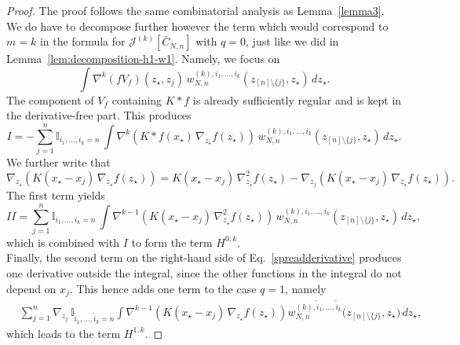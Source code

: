 \documentclass[pdflatex,sn-mathphys-num]{sn-jnl}
\theoremstyle{thmstyleone}%
\theoremstyle{thmstyletwo}%
\theoremstyle{thmstylethree}%
\begin{document}
\begin{proof} The proof follows the same combinatorial analysis as Lemma~\ref{lemma3}. We do have to decompose further however the term which would correspond to $m=k$ in the formula for $\mathcal{J}^{(k)}[\bar{C}_{N,n}]$ with $q=0$, just like we did in Lemma~\ref{lem:decomposition-h1-w1}. Namely, we focus on 
\[
\int \nabla^{k}(fV_f )(z_\star,z_j)\,
w^{(k),i_1,...,i_k}_{N,n}(z_{[n]\setminus\{j\}}, z_\star)\,dz_\star.
\]
The component of \(V_f\) containing \(K * f\) is already sufficiently regular and is kept in the derivative-free part. This produces
\[
I=-\sum_{j=1}^n \mathbb{I}_{i_1,\ldots,i_k=n}\,\int \nabla^k(K * f(x_\star)\,\nabla_{z_\star} f(z_\star))\,w^{(k),i_1,...,i_k}_{N,n}(z_{[n]\setminus\{j\}}, z_\star)\,dz_\star.
\]
We further write that
\begin{equation}
\nabla_{z_\star} (K(x_\star-x_j)\,\nabla_{z_\star} f(z_\star))=K(x_\star-x_j)\,\nabla_{z_\star}^2 f(z_\star)-\nabla_{z_j}(K(x_\star-x_j)\,\nabla_{z_\star} f(z_\star)).\label{spreadderivative}
\end{equation}
The first term yields
\[
II=\sum_{j=1}^n \mathbb{I}_{i_1,\ldots,i_k=n}\,\int \nabla^{k-1}(K(x_\star-x_j)\,\nabla_{z_\star}^2 f(z_\star))\,w^{(k),i_1,...,i_k}_{N,n}(z_{[n]\setminus\{j\}}, z_\star)\,dz_\star,
\]
which is combined with $I$ to form the term $H^{0,k}$.\\

\noindent
Finally, the second term on the right-hand side of Eq.~\eqref{spreadderivative} produces one derivative outside the integral, since the other functions in the integral do not depend on $x_j$. This hence adds one term to the case $q=1$, namely 
\[
\begin{aligned}
&
\sum_{j=1}^n
\nabla_{z_j}\,
\mathbb{I}_{\tilde i_1,\ldots,\tilde i_k=n}
\int
\nabla^{k-1}\!\left(
K(x_\star-x_j)\,
\nabla_{z_\star} f(z_\star)
\right)
w^{(k),\tilde i_1,\ldots,\tilde i_k}_{N,n}
\big(z_{[n]\setminus\{j\}},z_\star\big)\,
dz_\star,
\end{aligned}
\]
which leads to the term $H^{1,k}$.
\end{proof}
%
\end{document}
